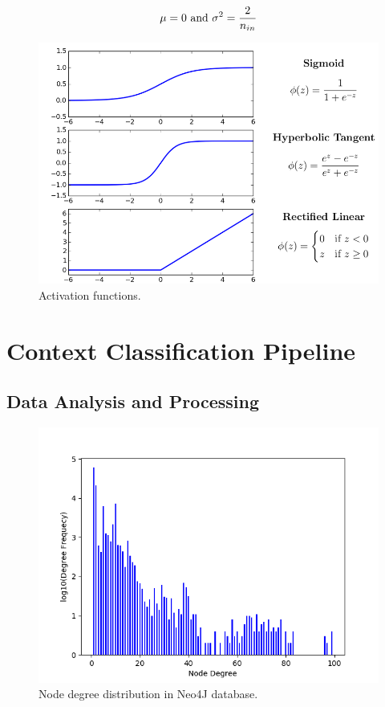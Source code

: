 \begin{equation}
  \centering
  \mu = 0 \ \text{and} \ \sigma^2 = \frac{2}{n_{in}}
\end{equation}

\bigskip

\begin{figure}[H]
  \centering
  \includegraphics[scale=0.4]{Images/activation_functions.png}
  \caption{Activation functions.}
  \label{activation_functions}
\end{figure}

\section{Context Classification Pipeline}
\subsection{Data Analysis and Processing}
\begin{figure}[H]
  \centering
  \centerline{\includegraphics[scale = 0.86]{Images/nodedegdist.png}}
  \caption{Node degree distribution in Neo4J database.}
  \label{nodedegdist}
\end{figure}
